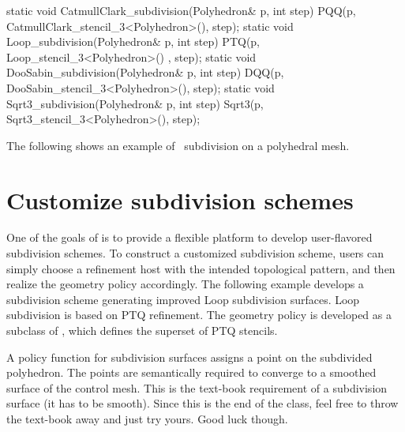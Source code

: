 \begin{ccExampleCode}
  static void CatmullClark_subdivision(Polyhedron& p, int step) {
    PQQ(p, CatmullClark_stencil_3<Polyhedron>(), step);
  }
  static void Loop_subdivision(Polyhedron& p, int step) {
    PTQ(p, Loop_stencil_3<Polyhedron>() , step);
  }
  static void DooSabin_subdivision(Polyhedron& p, int step) {
    DQQ(p, DooSabin_stencil_3<Polyhedron>(), step);
  }
  static void Sqrt3_subdivision(Polyhedron& p, int step) {
    Sqrt3(p, Sqrt3_stencil_3<Polyhedron>(), step);
  }
\end{ccExampleCode}

The following shows an example of \DS\ subdivision on a polyhedral mesh.

\section{Customize subdivision schemes}
One of the goals of  is 
to provide a flexible platform
to develop user-flavored subdivision schemes.
To construct a customized subdivision scheme, users can simply 
choose a refinement host with the intended topological pattern, 
and then realize the geometry policy accordingly. 
The following example develops a subdivision scheme
generating improved Loop subdivision surfaces. Loop subdivision is
based on PTQ refinement. The geometry policy is developed as a subclass 
of , which defines the superset of PTQ stencils.


A policy function for subdivision surfaces assigns a point on 
the subdivided polyhedron. The points are semantically
required to converge to a smoothed surface of the control mesh.
This is the text-book requirement of a subdivision 
surface (it has to be smooth). Since this is the end of the
class, feel free to throw the text-book away and just try yours. 
Good luck though.

